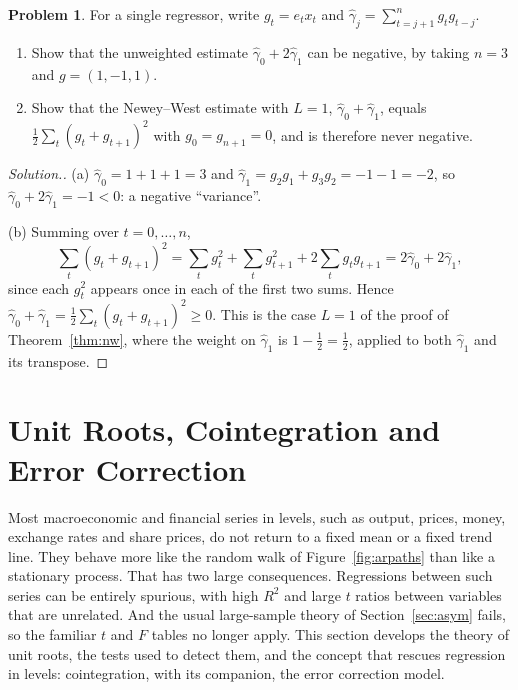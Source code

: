 \documentclass[11pt,a4paper]{article}
\numberwithin{equation}{section}
\theoremstyle{definition}
\newtheorem{problemx}{Problem}[subsection]
\newenvironment{problem}{\begin{problemx}}{\end{problemx}}
\newenvironment{solution}
  {\renewcommand{\qedsymbol}{}\begin{proof}[\textit{Solution}.]}
  {\end{proof}}
\begin{document}
\begin{problem}
\label{prob:hacscalar}
For a single regressor, write $g_t = e_tx_t$ and $\hat\gamma_j = \sum_{t=j+1}^ng_tg_{t-j}$.
\begin{enumerate}[label=(\alph*)]
\item Show that the unweighted estimate $\hat\gamma_0 + 2\hat\gamma_1$ can be negative, by taking $n = 3$ and $g = (1, -1, 1)$.
\item Show that the Newey--West estimate with $L = 1$, $\hat\gamma_0 + \hat\gamma_1$, equals $\frac12\sum_t(g_t + g_{t+1})^2$ with $g_0 = g_{n+1} = 0$, and is therefore never negative.
\end{enumerate}
\end{problem}

\begin{solution}
(a) $\hat\gamma_0 = 1 + 1 + 1 = 3$ and $\hat\gamma_1 = g_2g_1 + g_3g_2 = -1 - 1 = -2$, so $\hat\gamma_0 + 2\hat\gamma_1 = -1 < 0$: a negative ``variance''.

(b) Summing over $t = 0, \dots, n$,
\[
\sum_t(g_t + g_{t+1})^2 = \sum_tg_t^2 + \sum_tg_{t+1}^2 + 2\sum_tg_tg_{t+1} = 2\hat\gamma_0 + 2\hat\gamma_1 ,
\]
since each $g_t^2$ appears once in each of
the first two sums. Hence $\hat\gamma_0 + \hat\gamma_1 = \frac12\sum_t(g_t + g_{t+1})^2 \geq 0$. This is the case $L = 1$ of the proof of Theorem~\ref{thm:nw}, where the weight on $\hat\gamma_1$
is $1 - \frac12 = \frac12$, applied to both $\hat\gamma_1$ and its transpose.
\end{solution}

\section{Unit Roots, Cointegration and Error Correction}
\label{sec:unitroot}

Most macroeconomic and financial series in levels, such as output, prices, money, exchange rates and share prices, do not return to a fixed mean
or a fixed trend line. They behave more like the random walk of Figure~\ref{fig:arpaths} than like a stationary process. That has two large
consequences. Regressions between such series can be entirely spurious, with high $R^2$ and large $t$ ratios between variables that are unrelated.
And the usual large-sample theory of Section~\ref{sec:asym} fails, so the familiar $t$ and $F$ tables no longer apply. This section develops the
theory of unit roots, the tests used to detect them, and the concept that rescues regression in levels: cointegration, with its companion, the error
correction model.
\end{document}
